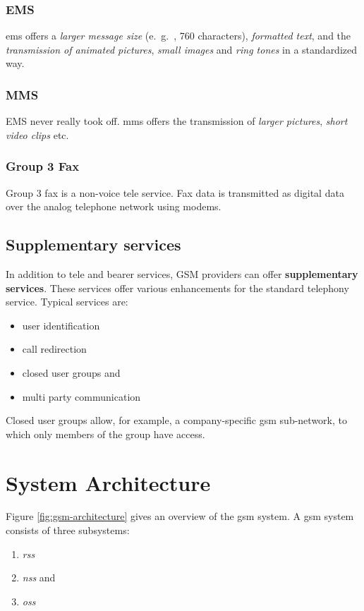 \subsubsection{EMS}
\gls{ems} offers a \textit{larger message size} (e.\ g.\ , 760 characters), \textit{formatted text}, and the \textit{transmission of animated pictures}, \textit{small images} and \textit{ring tones} in a standardized way. 

\subsubsection{MMS}
EMS never really took off. \gls{mms} offers the transmission of \textit{larger pictures}, \textit{short video clips} etc. 

\subsubsection{Group 3 Fax}
Group 3 fax is a non-voice tele service. Fax data is transmitted as digital data over the analog telephone network using modems. 


\subsection{Supplementary services}
In addition to tele and bearer services, GSM providers can offer \textbf{supplementary services}. These services offer various enhancements for the standard telephony service. Typical services are:

\begin{multicols}{2}
	\begin{itemize}
		\item user identification
		\item call redirection
		\item closed user groups and 
		\item multi party communication
	\end{itemize}
\end{multicols}

Closed user groups allow, for example, a company-specific \gls{gsm} sub-network, to which only members of the group have access.

\section{System Architecture}
Figure \ref{fig:gsm-architecture} gives an overview of the \gls{gsm} system. A \gls{gsm} system consists of three subsystems:
\begin{enumerate}
	\item \textit{\gls{rss}}
	\item \textit{\gls{nss}} and
	\item \textit{\gls{oss}}
\end{enumerate}

